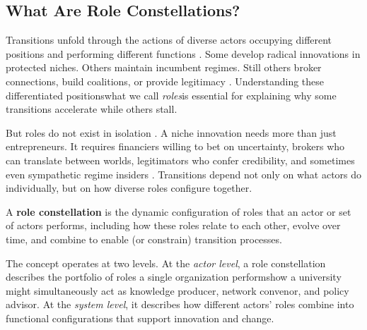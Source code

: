 \documentclass[../main.tex]{subfiles}
\begin{document}
\subsection{What Are Role Constellations?}

Transitions unfold through the actions of diverse actors occupying different positions and performing different functions \cite{avelino2009power,fischer2016actors,laakso2024}. Some develop radical innovations in protected niches. Others maintain incumbent regimes. Still others broker connections, build coalitions, or provide legitimacy \cite{burt1992structural,granovetter1973strength}. Understanding these differentiated positions\textemdash what we call \emph{roles}\textemdash is essential for explaining why some transitions accelerate while others stall.

But roles do not exist in isolation \cite{padgett2012emergence}. A niche innovation needs more than just entrepreneurs. It requires financiers willing to bet on uncertainty, brokers who can translate between worlds, legitimators who confer credibility, and sometimes even sympathetic regime insiders \cite{schot2018three,suchman1995managing}. Transitions depend not only on what actors do individually, but on how diverse roles configure together.

\begin{roledef}
A \textbf{role constellation} is the dynamic configuration of roles that an actor or set of actors performs, including how these roles relate to each other, evolve over time, and combine to enable (or constrain) transition processes.
\end{roledef}

The concept operates at two levels. At the \emph{actor level}, a role constellation describes the portfolio of roles a single organization performs\textemdash how a university might simultaneously act as knowledge producer, network convenor, and policy advisor. At the \emph{system level}, it describes how different actors' roles combine into functional configurations that support innovation and change.
\end{document}
